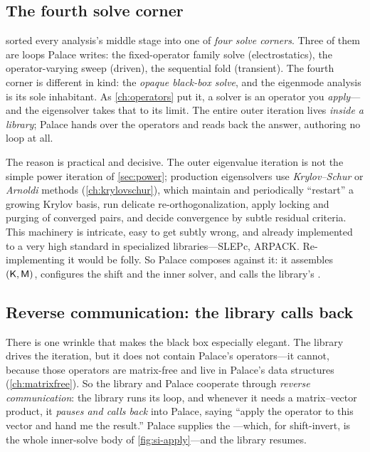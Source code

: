 \subsection{The fourth solve corner}

 sorted every analysis's middle stage into one of \emph{four
solve corners}. Three of them are loops Palace writes: the fixed-operator family
solve (electrostatics), the operator-varying sweep (driven), the sequential fold
(transient). The fourth corner is different in kind: the \emph{opaque black-box
solve}, and the eigenmode analysis is its sole inhabitant. As \cref{ch:operators}
put it, a solver is an operator you \emph{apply}---and the eigensolver takes that
to its limit. The entire outer iteration lives \emph{inside a library}; Palace
hands over the operators and reads back the answer, authoring no loop at all.

The reason is practical and decisive. The outer eigenvalue iteration is not the
simple power iteration of \cref{sec:power}; production eigensolvers use
\emph{Krylov--Schur} or \emph{Arnoldi} methods (\cref{ch:krylovschur}), which
maintain and periodically ``restart'' a growing Krylov basis, run delicate
re-orthogonalization, apply locking and purging of converged pairs, and decide
convergence by subtle residual criteria. This machinery is intricate, easy to get
subtly wrong, and already implemented to a very high standard in specialized
libraries---SLEPc, ARPACK. Re-implementing it would be folly. So Palace composes
against it: it assembles $(\mathsf{K},\mathsf{M})$, configures the shift and the inner solver,
and calls the library's .

\subsection{Reverse communication: the library calls back}

There is one wrinkle that makes the black box especially elegant. The library
drives the iteration, but it does not contain Palace's operators---it cannot,
because those operators are matrix-free and live in Palace's data structures
(\cref{ch:matrixfree}). So the library and Palace cooperate through
\emph{reverse communication}: the library runs its loop, and whenever it needs a
matrix--vector product, it \emph{pauses and calls back} into Palace, saying ``apply
the operator to this vector and hand me the result.'' Palace supplies the
---which, for shift-invert, is the whole inner-solve body of
\cref{fig:si-apply}---and the library resumes.

